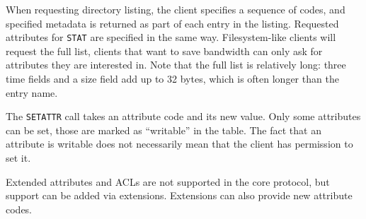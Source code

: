 When requesting directory listing, the client specifies a sequence of codes, and specified metadata is
returned as part of each entry in the listing. Requested attributes for {\tt STAT} are specified in the same
way. Filesystem-like clients will request the full list, clients that want to save bandwidth can only ask for
attributes they are interested in.  Note that the full list is relatively long: three time fields and a size
field add up to 32 bytes, which is often longer than the entry name.

The {\tt SETATTR} call takes an attribute code and its new value. Only some attributes can be set, those are
marked as ``writable'' in the table. The fact that an attribute is writable does not necessarily mean that the
client has permission to set it.

Extended attributes and ACLs are not supported in the core protocol, but support can be added via extensions.
Extensions can also provide new attribute codes.


